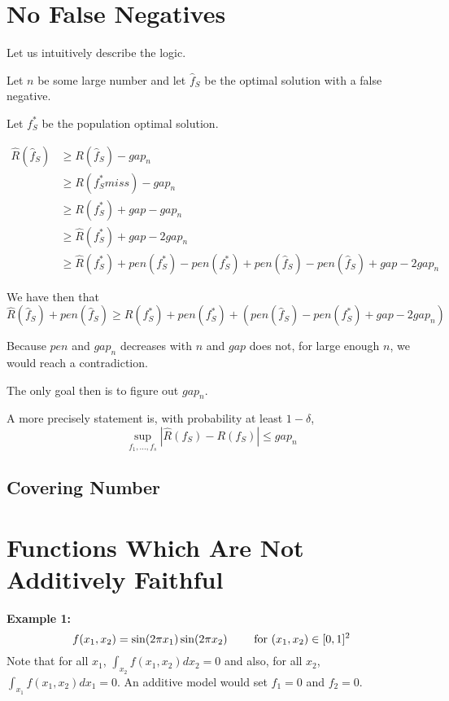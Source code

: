 \documentclass{article}
\begin{document}
\section{No False Negatives}

Let us intuitively describe the logic. 

Let $n$ be some large number and let $\hat{f}_S$ be the optimal solution with a false negative.

Let $f^*_S$ be the population optimal solution.

\begin{align*}
\hat{R}( \hat{f}_S ) &\geq R(\hat{f}_S) - gap_n \\
	&\geq R(f^*_S miss) - gap_n \\
	&\geq R(f^*_S) + gap - gap_n \\
	&\geq \hat{R}(f^*_S) + gap - 2 gap_n \\
	&\geq \hat{R}(f^*_S) + pen(f^*_S) - pen(f^*_S) + pen(\hat{f}_S) - pen(\hat{f}_S) + gap - 2 gap_n
\end{align*}


We have then that
\[
\hat{R}(\hat{f}_S) + pen(\hat{f}_S) \geq \hat{R}(f^*_S) + pen(f^*_S) + (pen(\hat{f}_S) - pen(f^*_S) + gap - 2 gap_n)
\]

Because $pen$ and $gap_n$ decreases with $n$ and $gap$ does not, for large enough $n$, we would reach a contradiction.

The only goal then is to figure out $gap_n$.

A more precisely statement is, with probability at least $1-\delta$, 
\[
\sup_{f_1, ..., f_s} | \hat{R}(f_S) - R(f_S) | \leq gap_n
\]

\subsection{Covering Number}



\section{Functions Which Are Not Additively Faithful}

\textbf{Example 1:}
\[
f(x_1, x_2) = \sin( 2\pi x_1) \sin( 2 \pi x_2) \qquad \textrm{ for } (x_1, x_2) \in [0,1]^2
\]
Note that for all $x_1$, $\int_{x_2} f(x_1, x_2) d x_2 = 0$ and also, for all $x_2$, $\int_{x_1} f(x_1, x_2) d x_1 = 0$.
An additive model would set $f_1 = 0$ and $f_2 = 0$. 

\begin{figure}[htp]
\end{figure}
\end{document}

